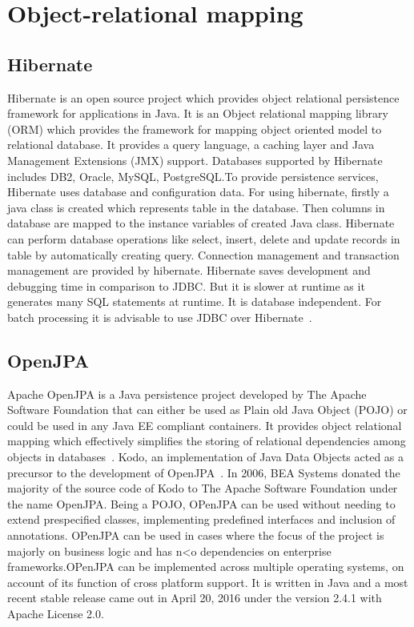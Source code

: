      \pv

\section{Object-relational mapping}
\label{S:o-db-object}

\subsection{Hibernate}

Hibernate is an open source project which provides object relational
persistence framework for applications in Java. It is an Object
relational mapping library (ORM) which provides the framework for
mapping object oriented model to relational database. It provides a
query language, a caching layer and Java Management Extensions (JMX)
support. Databases supported by Hibernate includes DB2, Oracle, MySQL,
PostgreSQL.To provide persistence services, Hibernate uses database
and configuration data. For using hibernate, firstly a java class is
created which represents table in the database. Then columns in
database are mapped to the instance variables of created Java
class. Hibernate can perform database operations like select, insert,
delete and update records in table by automatically creating
query. Connection management and transaction management are provided
by hibernate.  Hibernate saves development and debugging time in
comparison to JDBC.  But it is slower at runtime as it generates many
SQL statements at runtime. It is database independent. For batch
processing it is advisable to use JDBC over
Hibernate~\cite{www-hibernate}.

\subsection{OpenJPA}

Apache OpenJPA is a Java persistence project developed by The Apache
Software Foundation that can either be used as Plain old Java Object
(POJO) or could be used in any Java EE compliant containers. It
provides object relational mapping which effectively simplifies the
storing of relational dependencies among objects in
databases~\cite{www-openjpa}.  Kodo, an implementation of Java Data
Objects acted as a precursor to the development of
OpenJPA~\cite{www-openjpa-wiki}. In 2006, BEA Systems donated the
majority of the source code of Kodo to The Apache Software Foundation
under the name OpenJPA. Being a POJO, OPenJPA can be used without
needing to extend prespecified classes, implementing predefined
interfaces and inclusion of annotations. OPenJPA can be used in cases
where the focus of the project is majorly on business logic and has
n<o dependencies on enterprise frameworks.OPenJPA can be implemented
across multiple operating systems, on account of its function of cross
platform support. It is written in Java and a most recent stable
release came out in April 20, 2016 under the version 2.4.1 with Apache
License 2.0.

